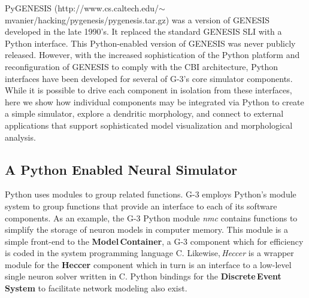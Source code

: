 \documentclass[10pt]{article}
\begin{document}
PyGENESIS
(http://www.cs.caltech.edu/$\sim$mvanier/hacking/pygenesis/pygenesis.tar.gz)
was a version of GENESIS developed in the late 1990's. It replaced the
standard GENESIS SLI with a Python interface. This Python-enabled
version of GENESIS was never publicly released.  However, with the
increased sophistication of the Python platform and reconfiguration of
GENESIS to comply with the CBI architecture, Python interfaces have
been developed for several of G-3's core simulator components.  While
it is possible to drive each component in isolation from these
interfaces, here we show how individual components may be integrated
via Python to create a simple simulator, explore a
dendritic morphology, and connect to external applications that
support sophisticated model visualization and morphological analysis.

\subsection*{A Python Enabled Neural Simulator}
\label{ss-apens}

Python uses modules to group related functions.  G-3 employs Python's
module system to group functions that provide an interface to each of
its software components.
As an example, the G-3 Python module {\it nmc} contains functions to
simplify the storage of neuron models in computer memory.  This module
is a simple front-end to the {\bf Model\,Container}, a G-3 component
which for efficiency is coded in the system programming language C.
Likewise,\,{\it Heccer} is a wrapper module for the {\bf Heccer}
component which in turn is an interface to a low-level single neuron
solver written in C.  Python bindings for the {\bf Discrete\,Event\,System} to facilitate network modeling also exist.
\end{document}
